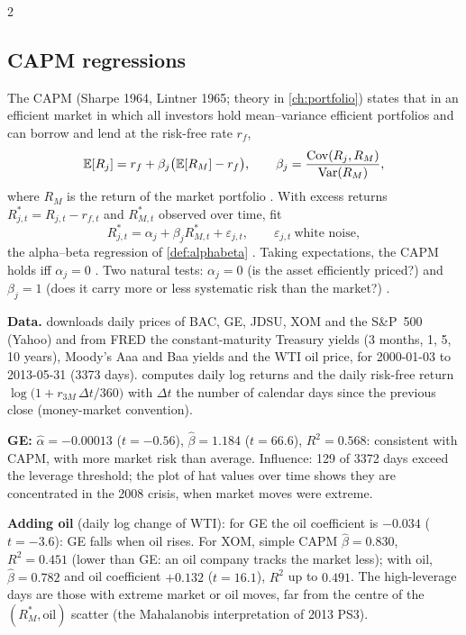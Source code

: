 \begin{paracol}{2}
\subsection{CAPM regressions}\label{ch05:capm}
The CAPM (Sharpe 1964, Lintner 1965; theory in \cref{ch:portfolio}) states that in an efficient market in which all
investors hold mean--variance efficient portfolios and can borrow and lend at the risk-free rate $r_f$,
\[
  \mathbb{E}[R_j]=r_f+\beta_j\bigl(\mathbb{E}[R_M]-r_f\bigr),\qquad \beta_j=\frac{\operatorname{Cov}(R_j,R_M)}{\operatorname{Var}(R_M)},
\]
where $R_M$ is the return of the market portfolio . With excess returns $R^*_{j,t}=R_{j,t}-r_{f,t}$ and
$R^*_{M,t}$ observed over time, fit
\[
  R^*_{j,t}=\alpha_j+\beta_jR^*_{M,t}+\varepsilon_{j,t},\qquad \varepsilon_{j,t}\ \text{white noise},
\]
the alpha--beta regression of \cref{def:alphabeta} . Taking expectations, the CAPM holds iff
$\alpha_j=0$ . Two natural tests: $\alpha_j=0$ (is the asset efficiently priced?) and $\beta_j=1$ (does it carry
more or less systematic risk than the market?) .

\begin{casestudy}
\textbf{Data.}  downloads daily prices of BAC, GE, JDSU, XOM and the S\&P~500 (Yahoo) and from FRED
the constant-maturity Treasury yields (3 months, 1, 5, 10 years), Moody's Aaa and Baa yields and the WTI oil price, for
2000-01-03 to 2013-05-31 (3373 days).  computes daily log returns and the daily risk-free
return $\log\bigl(1+r_{3M}\,\Delta t/360\bigr)$ with $\Delta t$ the number of calendar days since the previous close (money-market
convention).

\textbf{GE:} $\hat\alpha=-0.00013$ ($t=-0.56$), $\hat\beta=1.184$ ($t=66.6$), $R^2=0.568$: consistent with CAPM, with more market risk
than average. Influence: 129 of 3372 days exceed the leverage threshold; the plot of hat values over time shows they are
concentrated in the 2008 crisis, when market moves were extreme.

\textbf{Adding oil} (daily log change of WTI): for GE the oil coefficient is $-0.034$ ($t=-3.6$): GE falls when oil rises. For
XOM, simple CAPM $\hat\beta=0.830$, $R^2=0.451$ (lower than GE: an oil company tracks the market less); with oil,
$\hat\beta=0.782$ and oil coefficient $+0.132$ ($t=16.1$), $R^2$ up to $0.491$. The high-leverage days are those with extreme
market or oil moves, far from the centre of the $(R^*_M,\text{oil})$ scatter (the Mahalanobis interpretation of 2013
PS3).


\end{casestudy}
\end{paracol}
